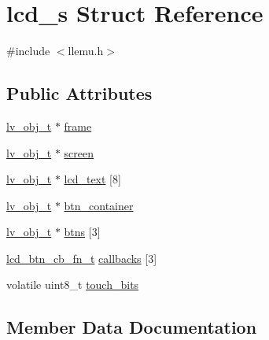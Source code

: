 \hypertarget{structlcd__s}{}\section{lcd\+\_\+s Struct Reference}
\label{structlcd__s}


{\ttfamily \#include $<$llemu.\+h$>$}

\subsection*{Public Attributes}
\begin{DoxyCompactItemize}
\item 
\mbox{\hyperlink{lv__obj_8h_a38023c894dabf8ae85bf86aa79981ceb}{lv\+\_\+obj\+\_\+t}} $\ast$ \mbox{\hyperlink{structlcd__s_a5067b029a06de4122b9629596a96ab2a}{frame}}
\item 
\mbox{\hyperlink{lv__obj_8h_a38023c894dabf8ae85bf86aa79981ceb}{lv\+\_\+obj\+\_\+t}} $\ast$ \mbox{\hyperlink{structlcd__s_ae9982890a610a39d2a2c6986652d96fc}{screen}}
\item 
\mbox{\hyperlink{lv__obj_8h_a38023c894dabf8ae85bf86aa79981ceb}{lv\+\_\+obj\+\_\+t}} $\ast$ \mbox{\hyperlink{structlcd__s_a79e5229a56be1854fa2f61cb6089f1c3}{lcd\+\_\+text}} \mbox{[}8\mbox{]}
\item 
\mbox{\hyperlink{lv__obj_8h_a38023c894dabf8ae85bf86aa79981ceb}{lv\+\_\+obj\+\_\+t}} $\ast$ \mbox{\hyperlink{structlcd__s_a5b02408bab493ec0b9feca4042028fe1}{btn\+\_\+container}}
\item 
\mbox{\hyperlink{lv__obj_8h_a38023c894dabf8ae85bf86aa79981ceb}{lv\+\_\+obj\+\_\+t}} $\ast$ \mbox{\hyperlink{structlcd__s_a66110a1c094e205651c998dfa28a57ff}{btns}} \mbox{[}3\mbox{]}
\item 
\mbox{\hyperlink{llemu_8h_a0f5bb2a3264a6ad95973f9c8e6b3198e}{lcd\+\_\+btn\+\_\+cb\+\_\+fn\+\_\+t}} \mbox{\hyperlink{structlcd__s_a94cf01cb0d74b92bdd798b95861ed2cd}{callbacks}} \mbox{[}3\mbox{]}
\item 
volatile uint8\+\_\+t \mbox{\hyperlink{structlcd__s_a6aaa4bc625cc13f48b47acd64bcfa757}{touch\+\_\+bits}}
\end{DoxyCompactItemize}


\subsection{Member Data Documentation}
\mbox{\label{structlcd__s_a5b02408bab493ec0b9feca4042028fe1}} 
